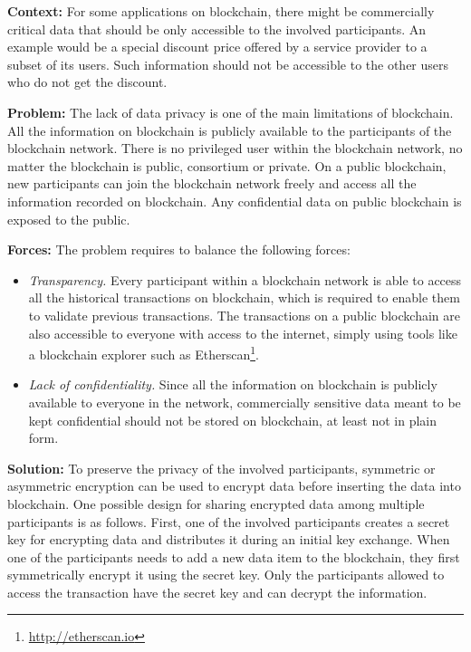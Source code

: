 \vspace{0.5em}\noindent \textbf{Context:} 
For some applications on blockchain, there might be commercially critical data that should be only accessible to the involved participants. An example would be a special discount price offered by a service provider to a subset of its users. Such information should not be accessible to the other users who do not get the discount. 

\vspace{0.5em}\noindent \textbf{Problem:} 
The lack of data privacy is one of the main limitations of blockchain. All the information on blockchain is publicly available to the participants of the blockchain network. There is no privileged user within the blockchain network, no matter the blockchain is public, consortium or private. On a public blockchain, new participants can join the blockchain network freely and access all the information recorded on blockchain. Any confidential data on public blockchain is exposed to the public.

\vspace{0.5em}\noindent \textbf{Forces:} The problem requires to balance the following forces:
\begin{itemize}
  \item \textit{Transparency.} Every participant within a blockchain network is able to access all the historical transactions on blockchain, which is required to enable them to validate previous transactions. The transactions on a public blockchain are also accessible to everyone with access to the internet, simply using tools like a blockchain explorer such as Etherscan\footnote{\label{etherscan}\url{http://etherscan.io}}. 
  
  \item \textit{Lack of confidentiality.} Since all the information on blockchain is publicly available to everyone in the network, commercially sensitive data meant to be kept confidential should not be stored on blockchain, at least not in plain form.
\end{itemize}

\vspace{0.5em}\noindent \textbf{Solution:} 
To preserve the privacy of the involved participants, symmetric or asymmetric encryption can be used to encrypt data before inserting the data into blockchain. One possible design for sharing encrypted data among multiple participants is as follows. First, one of the involved participants creates a secret key for encrypting data and distributes it during an initial key exchange. When one of the participants needs to add a new data item to the blockchain, they first symmetrically encrypt it using the secret key. Only the participants allowed to access the transaction have the secret key and can decrypt the information. 

